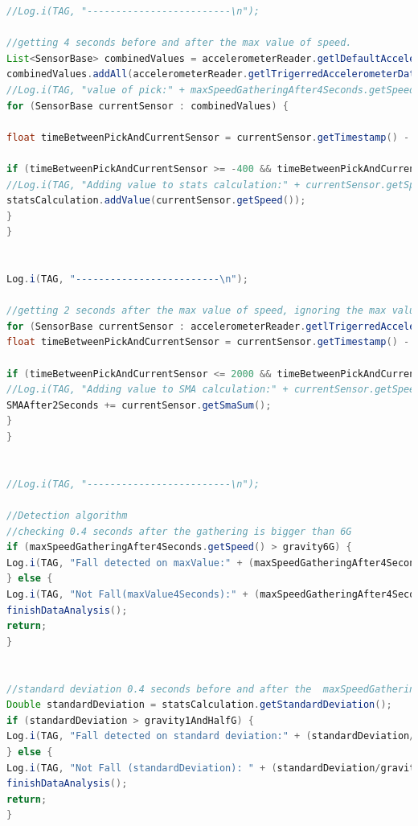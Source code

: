 \begin{lstlisting}[caption=Algoritmo de Detecção de Quedas em Java, label=cod:java, language=JAVA, frame=single, breaklines=true]
//Log.i(TAG, "-------------------------\n");

//getting 4 seconds before and after the max value of speed.
List<SensorBase> combinedValues = accelerometerReader.getlDefaultAccelerometerData();
combinedValues.addAll(accelerometerReader.getlTrigerredAccelerometerData());
//Log.i(TAG, "value of pick:" + maxSpeedGatheringAfter4Seconds.getSpeed()/gravity + " at " + maxSpeedGatheringAfter4Seconds.getDate() + " on " + maxSpeedGatheringAfter4Seconds.getTimestamp());
for (SensorBase currentSensor : combinedValues) {

float timeBetweenPickAndCurrentSensor = currentSensor.getTimestamp() - maxSpeedGatheringAfter4Seconds.getTimestamp();

if (timeBetweenPickAndCurrentSensor >= -400 && timeBetweenPickAndCurrentSensor <= 400) {
//Log.i(TAG, "Adding value to stats calculation:" + currentSensor.getSpeed() + " at " + currentSensor.getDate() + " on " + currentSensor.getTimestamp() );
statsCalculation.addValue(currentSensor.getSpeed());
}
}


Log.i(TAG, "-------------------------\n");

//getting 2 seconds after the max value of speed, ignoring the max value
for (SensorBase currentSensor : accelerometerReader.getlTrigerredAccelerometerData()) {
float timeBetweenPickAndCurrentSensor = currentSensor.getTimestamp() - maxSpeedGatheringAfter4Seconds.getTimestamp();

if (timeBetweenPickAndCurrentSensor <= 2000 && timeBetweenPickAndCurrentSensor > 0) {
//Log.i(TAG, "Adding value to SMA calculation:" + currentSensor.getSpeed() + " at " + currentSensor.getDate() + " on " + currentSensor.getTimestamp() );
SMAAfter2Seconds += currentSensor.getSmaSum();
}
}


//Log.i(TAG, "-------------------------\n");

//Detection algorithm
//checking 0.4 seconds after the gathering is bigger than 6G
if (maxSpeedGatheringAfter4Seconds.getSpeed() > gravity6G) {
Log.i(TAG, "Fall detected on maxValue:" + (maxSpeedGatheringAfter4Seconds.getSpeed()/gravity) + "G");
} else {
Log.i(TAG, "Not Fall(maxValue4Seconds):" + (maxSpeedGatheringAfter4Seconds.getSpeed()/gravity) + "G");
finishDataAnalysis();
return;
}


//standard deviation 0.4 seconds before and after the  maxSpeedGatheringAfter4Seconds is higher than 1.5G
Double standardDeviation = statsCalculation.getStandardDeviation();
if (standardDeviation > gravity1AndHalfG) {
Log.i(TAG, "Fall detected on standard deviation:" + (standardDeviation/gravity) + "G");
} else {
Log.i(TAG, "Not Fall (standardDeviation): " + (standardDeviation/gravity) + "G");
finishDataAnalysis();
return;
}


\end{lstlisting}
